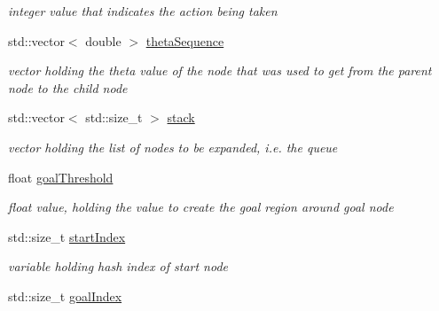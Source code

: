 \begin{DoxyCompactItemize}
\begin{DoxyCompactList}\small\item\em integer value that indicates the action being taken \end{DoxyCompactList}\item 
std\+::vector$<$ double $>$ \hyperlink{classPathPlanner_a21aea5a166c62ab1227af43058b40a08}{theta\+Sequence}\hypertarget{classPathPlanner_a21aea5a166c62ab1227af43058b40a08}{}\label{classPathPlanner_a21aea5a166c62ab1227af43058b40a08}

\begin{DoxyCompactList}\small\item\em vector holding the theta value of the node that was used to get from the parent node to the child node \end{DoxyCompactList}\item 
std\+::vector$<$ std\+::size\+\_\+t $>$ \hyperlink{classPathPlanner_a8ba6f4259695316e720e739756bc8e3c}{stack}\hypertarget{classPathPlanner_a8ba6f4259695316e720e739756bc8e3c}{}\label{classPathPlanner_a8ba6f4259695316e720e739756bc8e3c}

\begin{DoxyCompactList}\small\item\em vector holding the list of nodes to be expanded, i.\+e. the queue \end{DoxyCompactList}\item 
float \hyperlink{classPathPlanner_a718c814fcb3d400672e560c499993829}{goal\+Threshold}\hypertarget{classPathPlanner_a718c814fcb3d400672e560c499993829}{}\label{classPathPlanner_a718c814fcb3d400672e560c499993829}

\begin{DoxyCompactList}\small\item\em float value, holding the value to create the goal region around goal node \end{DoxyCompactList}\item 
std\+::size\+\_\+t \hyperlink{classPathPlanner_a19efd1bc9355469eca4c11d6d2fae9e5}{start\+Index}\hypertarget{classPathPlanner_a19efd1bc9355469eca4c11d6d2fae9e5}{}\label{classPathPlanner_a19efd1bc9355469eca4c11d6d2fae9e5}

\begin{DoxyCompactList}\small\item\em variable holding hash index of start node \end{DoxyCompactList}\item 
std\+::size\+\_\+t \hyperlink{classPathPlanner_a8208e1e8bad3fce2252ae4c4d16f6c53}{goal\+Index}\hypertarget{classPathPlanner_a8208e1e8bad3fce2252ae4c4d16f6c53}{}\label{classPathPlanner_a8208e1e8bad3fce2252ae4c4d16f6c53}


\end{DoxyCompactItemize}
